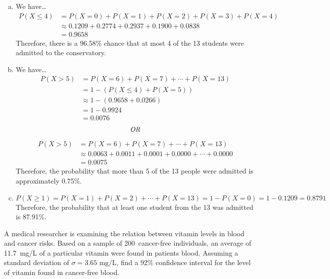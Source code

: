 \documentclass[12pt,letterpaper]{exam}
\begin{document}
\begin{questions}
{\begin{enumerate}[(a)]
\item We have\dots
	\[
	\begin{aligned}
	P(X \leq 4)&= P(X= 0) + P(X= 1) + P(X= 2) + P(X= 3) + P(X= 4) \\[0.1cm]
	&\approx 0.1209 + 0.2774 + 0.2937 + 0.1900 + 0.0838 \\[0.1cm]
	&= 0.9658
	\end{aligned}
	\]
Therefore, there is a 96.58\% chance that at most 4 of the 13 students were admitted to the conservatory. 

\item We have\dots
	\[
	\begin{aligned}
	P(X > 5)&= P(X= 6) + P(X= 7) + \cdots + P(X= 13) \\[0.1cm]
	&= 1 - \left( P(X \leq 4) + P(X= 5) \right) \\[0.1cm]
	&\approx 1 - ( 0.9658 + 0.0266) \\[0.1cm]
	&= 1 - 0.9924 \\[0.3cm]
	&= 0.0076
	\end{aligned}
	\]
	\[ \text{\itshape OR} \]
	\[
	\begin{aligned}
	P(X > 5)&= P(X= 6) + P(X= 7) + \cdots + P(X= 13) \\[0.1cm]
	&\approx 0.0063 + 0.0011 + 0.0001 + 0.0000 + \cdots + 0.0000 \\[0.1cm]
	&= 0.0075
	\end{aligned}
	\]
Therefore, the probability that more than 5 of the 13 people were admitted is approximately 0.75\%. 

\item 
	\[
	P(X \geq 1)= P(X= 1) + P(X= 2) + \cdots + P(X= 13)= 1 - P(X= 0)= 1 - 0.1209= 0.8791
	\]
Therefore, the probability that at least one student from the 13 was admitted is 87.91\%.
\end{enumerate}
}



\newpage
\question[10] A medical researcher is examining the relation between vitamin levels in blood and cancer risks. Based on a sample of 200~cancer-free individuals, an average of 11.7~mg/L of a particular vitamin were found in patients blood. Assuming a standard deviation of $\sigma= 3.65 \text{ mg/L}$, find a 92\% confidence interval for the level of vitamin found in cancer-free blood. \pspace


\end{questions}
\end{document}
